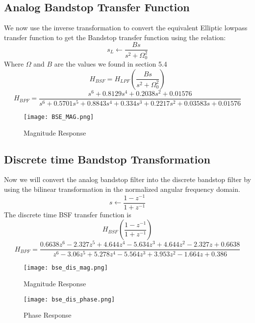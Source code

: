 \documentclass[12pt]{article}
\begin{document}
\subsection{\textbf{Analog Bandstop Transfer Function}}
We now use the inverse transformation to convert the equivalent Elliptic
lowpass transfer function to get the Bandstop transfer function using the
relation:
\begin{equation*}
    s_L \longleftarrow \frac{Bs}{s^2+\Omega_0^2}
\end{equation*}
Where $\Omega$ and $B$ are the values we found in section 5.4\\
\begin{equation*}
    H_{BSF}=H_{LPF}(\frac{Bs}{s^2+\Omega_0^2}) 
\end{equation*}
\begin{equation*}
    H_{BPF} = \frac{ s^6 + 0.8129 s^4 + 0.2038 s^2 + 0.01576}{s^6 + 0.5701 s^5 + 0.8843 s^4 + 0.334 s^3 + 0.2217 s^2 + 0.03583 s + 0.01576 }
\end{equation*}
\begin{figure}[H]
\centering
\texttt{[image: BSE\_MAG.png]}
\caption{Magnitude Response}
\label{fig:mesh2}
\end{figure}
\subsection{\textbf{Discrete time Bandstop Transformation}}
Now we will convert the analog bandstop filter into the discrete bandstop filter by using the bilinear transformation in the normalized angular frequency domain.
\begin{equation*}
    s \longleftarrow \frac{1-z^{-1}}{1+z^{-1}}
\end{equation*}
The discrete time BSF transfer function is
\begin{equation*}
    H_{BSF}\left (\frac{1-z^{-1}}{1+z^{-1}}\right) 
\end{equation*}
\begin{equation*}
     H_{BPF} = \frac{0.6638 z^6 - 2.327 z^5 + 4.644 z^4 - 5.634 z^3 + 4.644 z^2 - 2.327 z + 0.6638}{ z^6 - 3.06 z^5 + 5.278 z^4 - 5.564 z^3 + 3.953 z^2 - 1.664 z + 0.386}
\end{equation*}
\begin{figure}[H]
\centering
\texttt{[image: bse\_dis\_mag.png]}
\caption{Magnitude Response}
\label{fig:mesh2}
\end{figure}
\begin{figure}[H]
\centering
\texttt{[image: bse\_dis\_phase.png]}
\caption{Phase Response}
\label{fig:mesh2}
\end{figure}
\end{document}
